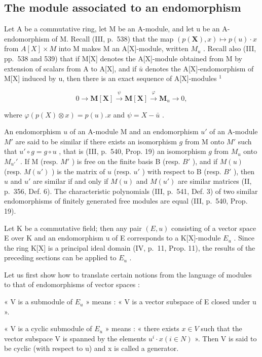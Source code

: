 \subsection{The module associated to an endomorphism}

Let A be a commutative ring, let M be an A-module, and let u be an A-endomorphism of M. Recall (III, p.~538) that the map \((p(\mathbf{X}), x) \mapsto p(u) \cdot x\) from \(A[X] \times M\) into M makes M an A{[}X{]}-module, written \(M_{u}\) . Recall also (III, pp.~538 and 539) that if M{[}X{]} denotes the A{[}X{]}-module obtained from M by extension of scalars from A to A{[}X{]}, and if \(\bar{u}\) denotes the A{[}X{]}-endomorphism of M{[}X{]} induced by u, then there is an exact sequence of A{[}X{]}-modules \(^{1}\)

\[
0 \to \mathbf {M} [ \mathbf {X} ] \stackrel {\psi} {\to} \mathbf {M} [ \mathbf {X} ] \stackrel {\varphi} {\to} \mathbf {M} _ {u} \to 0,\tag{1}
\]

where \(\varphi(p(X) \otimes x) = p(u).x\) and \(\psi = X - \bar{u}\) .

An endomorphism \(u\) of an A-module M and an endomorphism \(u'\) of an A-module \(M'\) are said to be similar if there exists an isomorphism \(g\) from M onto \(M'\) such that \(u' \circ g = g \circ u\) , that is (III, p.~540, Prop. 19) an isomorphism \(g\) from \(M_u\) onto \(M_{u'}'\) . If M (resp. \(M'\) ) is free on the finite basis B (resp. \(B'\) ), and if \(M(u)\) (resp. \(M(u')\) ) is the matrix of \(u\) (resp. \(u'\) ) with respect to B (resp. \(B'\) ), then \(u\) and \(u'\) are similar if and only if \(M(u)\) and \(M(u')\) are similar matrices (II, p.~356, Def. 6). The characteristic polynomials (III, p.~541, Def. 3) of two similar endomorphisms of finitely generated free modules are equal (III, p.~540, Prop. 19).

Let K be a commutative field; then any pair \((E, u)\) consisting of a vector space E over K and an endomorphism u of E corresponds to a K{[}X{]}-module \(E_{u}\) . Since the ring K{[}X{]} is a principal ideal domain (IV, p.~11, Prop. 11), the results of the preceding sections can be applied to \(E_{u}\) .

Let us first show how to translate certain notions from the language of modules to that of endomorphisms of vector spaces :

« V is a submodule of \(E_{u}\) » means : « V is a vector subspace of E closed under u ».

« V is a cyclic submodule of \(E_{u}\) » means : « there exists \(x \in V\) such that the vector subspace V is spanned by the elements \(u^{i} \cdot x (i \in N)\) ». Then V is said to be cyclic (with respect to u) and x is called a generator.

